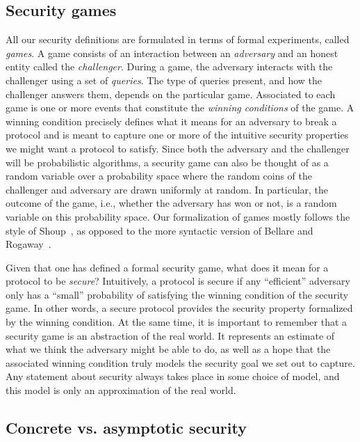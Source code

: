 \subsection{Security games}

All our security definitions are formulated in terms of formal experiments, called \emph{games}.
A game consists of an interaction between an \emph{adversary} and an honest entity called the \emph{challenger}.
During a game,
the adversary interacts with the challenger using a set of \emph{queries}.
The type of queries present,
and how the challenger answers them,
depends on the particular game.
Associated to each game is one or more events that constitute the \emph{winning conditions} of the game. 
A winning condition precisely defines what it means for an adversary to break a protocol and is meant to capture one or more of the intuitive security properties we might want a protocol to satisfy.
Since both the adversary and the challenger will be probabilistic algorithms,
a security game can also be thought of as a random variable over a probability space where the random coins of the challenger and adversary are drawn uniformly at random.
In particular,
the outcome of the game,
i.e., whether the adversary has won or not,
is a random variable on this probability space.
Our formalization of games mostly follows the style of Shoup~\cite{EPRINT:Shoup04},
as opposed to the more syntactic version of Bellare and Rogaway~\cite{EPRINT:BelRog04}.

Given that one has defined a formal security game,
what does it mean for a protocol to be \emph{secure}? 
Intuitively,
a protocol is secure if any ``efficient'' adversary only has a ``small'' probability of satisfying the winning condition of the security game.
In other words,
a secure protocol provides the security property formalized by the winning condition.
At the same time,
it is important to remember that a security game is an abstraction of the real world.
It represents an estimate of what we think the adversary might be able to do,
as well as a hope that the associated winning condition truly models the security goal we set out to capture.
Any statement about security always takes place in some choice of model,
and this model is only an approximation of the real world.



\subsection{Concrete vs. asymptotic security}

